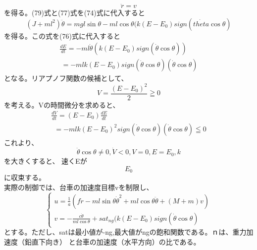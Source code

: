 \documentclass{jarticle}
\begin{document}
\begin{enumerate}
\begin{enumerate}
				\begin{equation}
					\ddot{r} = v
				\end{equation}
				を得る。(79)式と(77)式を(74)式に代入すると
				\begin{equation}
					(J+ml^{2})\ddot{\theta} = mgl\sin{\theta}-ml\cos{\theta}(k(E-E_{0})sign(\dot{theta}\cos{\theta})
				\end{equation}
				を得る。この式を(76)式に代入すると
				\begin{equation}
					\begin{array}{l}
						\frac{dE}{dt} = -ml\dot{\theta}(k(E-E_{0})sign(\dot{\theta}\cos{\theta}))\\
						\ = -mlk(E-E_{0})sign(\dot{\theta}\cos{\theta})(\dot{\theta}\cos{\theta})
					\end{array}
				\end{equation}
				となる。リアプノフ関数の候補として、
				\begin{equation}
					V = \frac{(E-E_{0})^{2}}{2}≧0
				\end{equation}
				を考える。Vの時間微分を求めると、
				\begin{equation}
					\begin{array}{l}
						\frac{dV}{dt} = (E - E_{0})\frac{dE}{dt}\\
						\ \ = -mlk(E-E_{0})^{2}sign(\dot{\theta}\cos{\theta})(\dot{\theta}\cos{\theta})≦0
					\end{array}
				\end{equation}
				これより、\[\dot{\theta}\cos{\theta}≠0, \dot{V}<0,V=0,E=E_{0},k\]を大きくすると、
				速くEが\[E_{0}\]に収束する。\\
				実際の制御では、台車の加速度目標vを制限し、
				\begin{equation}
					\left\{
					\begin{array}{l}
						u = \frac{1}{a}\left(f\dot{r} - ml\sin{\theta}\dot{\theta}^2 + ml\cos{\theta}\ddot{\theta}+(M+m)v \right)\\
						v = -\frac{c\dot{\theta}}{ml\cos{\theta}}+sat_{ng}(k(E-E_{0})sign(\dot{\theta}\cos{\theta})
					\end{array}
					\right.
				\end{equation}
				とする。ただし、satは最小値が-ng,最大値がngの飽和関数である。ｎは、重力加速度（鉛直下向き）
				と台車の加速度（水平方向）の比である。\\
			

\end{enumerate}
\end{enumerate}
\end{document}
